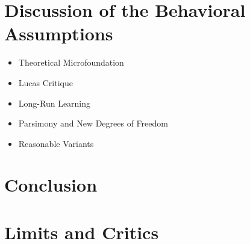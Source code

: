 \documentclass{beamer}
\newcommand\ReduceFont{\fontsize{10}{7.2}\selectfont}
\begin{document}
\section{Discussion of the Behavioral Assumptions}
\begin{frame}
    \ReduceFont
\end{frame}

\begin{frame}
    \begin{itemize}
        \item Theoretical Microfoundation
        \item Lucas Critique
        \item Long-Run Learning
        \item Parsimony and New Degrees of Freedom
        \item Reasonable Variants
    \end{itemize}
\end{frame}

\section{Conclusion}
\begin{frame}
    \ReduceFont
\end{frame}

\begin{frame}
    \tableofcontents[currentsection, hideothersubsections, sections=\value{section}]
\end{frame}

\section{Limits and Critics}
\begin{frame}
    \ReduceFont
\end{frame}

\begin{frame}
    \tableofcontents[currentsection, hideothersubsections, sections=\value{section}]
\end{frame}
\end{document}
